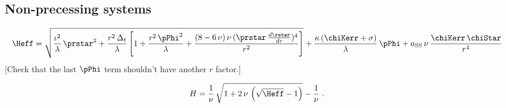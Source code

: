 \documentclass[twoside, aps, prd, letterpaper, noshowpacs, %
amsmath, amssymb, amsfonts, nofootinbib, floatfix, notitlepage]%
{revtex4-1}
\newcommand{\drstardr}{\frac{d\rstar}{dr}}
\begin{document}
\subsection{Non-precessing systems}
\label{sec:NonprecessingSystems}

\begin{equation}
  \label{eq:HeffSpin}
  \Heff = \sqrt{ \frac{\iota^{2}}{\lambda}\,
    \prstar^{2} + \frac{r^{2}\, \Delta_{t}} {\lambda} \left[ 1 +
      \frac{r^{2}\, \pPhi^{2}} {\lambda} + \frac{(8-6\, \nu)\, \nu\,
        (\prstar\, \drstardr)^{4}} {r^{2}} \right] } + \frac{\kappa\,
    (\chiKerr + \sigma)} {\lambda}\, \pPhi + a_{\text{SS}}\, \nu\,
  \frac{\chiKerr\, \chiStar} {r^{4}}
\end{equation}
[Check that the last $\pPhi$ term shouldn't have another $r$ factor.]

\begin{equation}
  \label{eq:HamiltonianSpin}
  H = \frac{1}{\nu}\, \sqrt{1 + 2\, \nu\, \left(
      \sqrt{\Heff} - 1 \right)} - \frac{1}{\nu}~.
\end{equation}


\appendix* %







\end{document}
